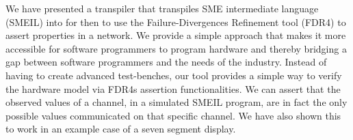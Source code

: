 We have presented a transpiler that transpiles SME intermediate language (SMEIL) into \cspm{} for then to use the Failure-Divergences Refinement tool (FDR4) to assert properties in a \cspm{} network. We provide a simple approach that makes it more accessible for software programmers to program hardware and thereby bridging a gap between software programmers and the needs of the industry.
Instead of having to create advanced test-benches, our tool provides a simple way to verify the hardware model via FDR4s assertion functionalities. We can assert that the observed values of a channel, in a simulated SMEIL program, are in fact the only possible values communicated on that specific channel. We have also shown this to work in an example case of a seven segment display.
